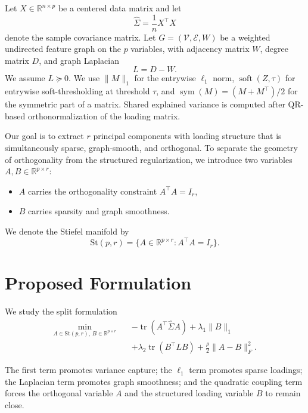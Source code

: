 \documentclass[10pt,twocolumn,letterpaper]{article}
\theoremstyle{definition}
\newcommand{\R}{\mathbb{R}}
\newcommand{\stiefel}{\mathrm{St}}
\newcommand{\Sigmahat}{\widehat{\Sigma}}
\DeclareMathOperator{\soft}{soft}
\DeclareMathOperator{\tr}{tr}
\DeclareMathOperator{\sym}{sym}
\begin{document}
Let $X \in \R^{n \times p}$ be a centered data matrix and let
\begin{equation}
    \Sigmahat = \frac{1}{n} X^\top X
\end{equation}
denote the sample covariance matrix. Let $G=(\mathcal{V},\mathcal{E},W)$ be a weighted undirected feature graph on the $p$ variables, with adjacency matrix $W$, degree matrix $D$, and graph Laplacian
\begin{equation}
    L = D - W.
\end{equation}
We assume $L \succeq 0$.
We use $\|M\|_1$ for the entrywise $\ell_1$ norm, $\soft(Z,\tau)$ for entrywise soft-thresholding at threshold $\tau$, and $\sym(M) = (M+M^\top)/2$ for the symmetric part of a matrix. Shared explained variance is computed after QR-based orthonormalization of the loading matrix.

Our goal is to extract $r$ principal components with loading structure that is simultaneously sparse, graph-smooth, and orthogonal. To separate the geometry of orthogonality from the structured regularization, we introduce two variables $A,B \in \R^{p \times r}$:
\begin{itemize}[leftmargin=*]
    \item $A$ carries the orthogonality constraint $A^\top A = I_r$,
    \item $B$ carries sparsity and graph smoothness.
\end{itemize}

We denote the Stiefel manifold by
\begin{equation}
    \stiefel(p,r) = \{ A \in \R^{p \times r} : A^\top A = I_r \}.
\end{equation}

\section{Proposed Formulation}
\label{sec:formulation}

We study the split formulation
\begin{equation}
\label{eq:main_obj}
\begin{aligned}
\min_{A \in \stiefel(p,r),\, B \in \R^{p \times r}} \quad
&-\tr(A^\top \Sigmahat A)
+ \lambda_1 \|B\|_1 \\
&+ \lambda_2 \tr(B^\top L B)
+ \frac{\rho}{2}\|A-B\|_F^2.
\end{aligned}
\end{equation}

The first term promotes variance capture; the $\ell_1$ term promotes sparse loadings; the Laplacian term promotes graph smoothness; and the quadratic coupling term forces the orthogonal variable $A$ and the structured loading variable $B$ to remain close.
\end{document}
